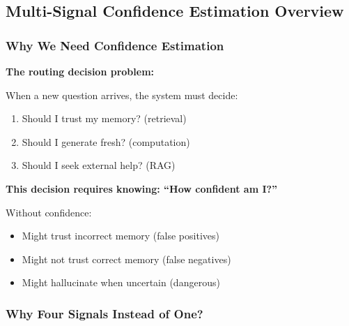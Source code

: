 \documentclass[12pt,a4paper]{article}
\theoremstyle{definition}
\begin{document}
\subsection{Multi-Signal Confidence Estimation Overview}

\subsubsection{Why We Need Confidence Estimation}

\begin{problembox}
\textbf{The routing decision problem:}

When a new question arrives, the system must decide:
\begin{enumerate}
    \item Should I trust my memory? (retrieval)
    \item Should I generate fresh? (computation)
    \item Should I seek external help? (RAG)
\end{enumerate}

\textbf{This decision requires knowing: ``How confident am I?''}

Without confidence:
\begin{itemize}
    \item Might trust incorrect memory (false positives)
    \item Might not trust correct memory (false negatives)
    \item Might hallucinate when uncertain (dangerous)
\end{itemize}
\end{problembox}

\subsubsection{Why Four Signals Instead of One?}
\end{document}
